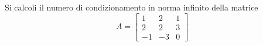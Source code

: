 Si calcoli il numero di condizionamento in norma infinito della 
matrice
\bigskip
\[
A=\left[
\begin{array}{ccc}
1 & 2 & 1 \\
2 & 2 & 3\\
-1 & -3 & 0
\end{array}\right]
\]
